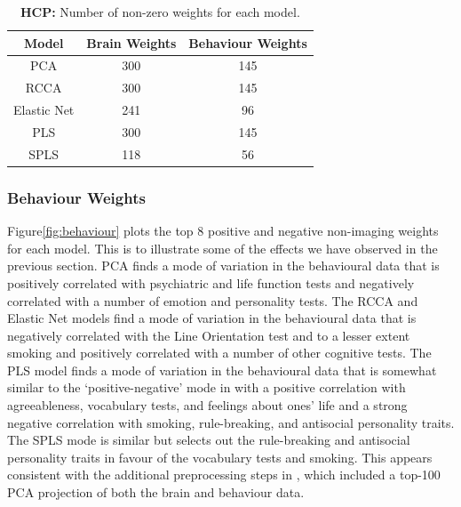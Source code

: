 \begin{table}[h]
    \centering
    \caption{\textbf{HCP:} Number of non-zero \gls{weights} for each model.}
    \begin{tabular}{|c|c|c|}
        \hline
        Model       & Brain Weights & Behaviour Weights \\
        \hline
        PCA         & 300           & 145               \\
        RCCA        & 300           & 145               \\
        Elastic Net & 241           & 96                \\
        PLS         & 300           & 145               \\
        SPLS        & 118           & 56                \\
        \hline
    \end{tabular}\label{tab:brain-behaviour-weights-hcp}
\end{table}

\subsubsection{Behaviour Weights}

Figure\ref{fig:behaviour} plots the top 8 positive and negative non-imaging \gls{weights} for each model.
This is to illustrate some of the effects we have observed in the previous section.
PCA finds a mode of variation in the behavioural data that is positively correlated with psychiatric and life function tests and negatively correlated with a number of emotion and personality tests.
The RCCA and Elastic Net models find a mode of variation in the behavioural data that is negatively correlated with the Line Orientation test and to a lesser extent smoking and positively correlated with a number of other cognitive tests.
The PLS model finds a mode of variation in the behavioural data that is somewhat similar to the `positive-negative' mode in \citet{smith2015positive} with a positive correlation with agreeableness, vocabulary tests, and feelings about ones' life and a strong negative correlation with smoking, rule-breaking, and antisocial personality traits.
The SPLS mode is similar but selects out the rule-breaking and antisocial personality traits in favour of the vocabulary tests and smoking. This appears consistent with the additional preprocessing steps in \citet{smith2015positive}, which included a top-100 PCA projection of both the brain and behaviour data.

